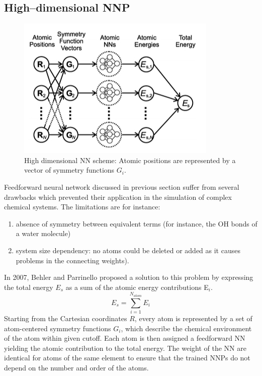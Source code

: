 \documentclass[12pt]{article}
\begin{document}
%
\subsection{High--dimensional NNP}
\begin{figure}[!htp]
    \centering
    \includegraphics[scale=0.7]{High-dimensional-NNP_scheme.jpeg}
    \caption{High dimensional NN scheme: Atomic positions are represented by a vector of symmetry functions $G_i$. }
    \label{High-dimensional-NNP_scheme}
\end{figure}
Feedforward neural network discussed in previous section suffer from several drawbacks which prevented their application in the simulation of complex chemical systems. The limitations are for instance:
\begin{enumerate}
    \item absence of symmetry between equivalent terms (for instance, the OH bonds of a water molecule)
    \item system size dependency: no atoms could be deleted or added as it causes problems in the connecting weights).
\end{enumerate}
In 2007, Behler and Parrinello proposed a solution to this problem by expressing the total energy $E_s$ as a sum of the atomic energy contributions E$_i$.\cite{Behler2007}
\begin{equation}
    E_s = \sum_{i=1}^{N_{atom}} E_i
\end{equation}
Starting from the Cartesian coordinates $R$, every atom is represented by a set of atom-centered symmetry functions $G_i$, which describe the chemical environment of the atom within given cutoff. Each atom is then assigned a feedforward NN yielding the atomic contribution to the total energy. The weight of the NN are identical for atoms of the same element to ensure that the trained NNPs do not depend on the number and order of the atoms.
%
\end{document}
